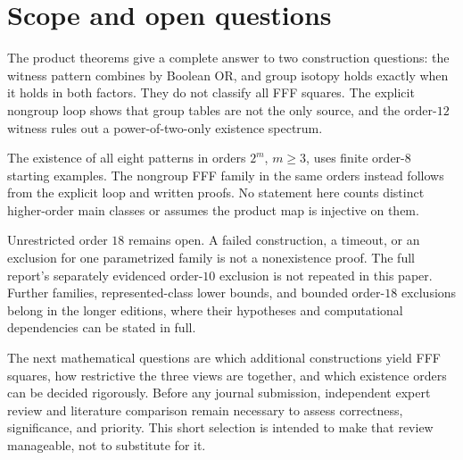 \section{Scope and open questions}

The product theorems give a complete answer to two construction questions:
the witness pattern combines by Boolean OR, and group isotopy holds exactly
when it holds in both factors. They do not classify all FFF squares. The
explicit nongroup loop shows that group tables are not the only source,
and the order-$12$ witness rules out a power-of-two-only existence spectrum.

The existence of all eight patterns in orders $2^m$, $m\geq3$, uses finite
order-$8$ starting examples. The nongroup FFF family in the same orders
instead follows from the explicit loop and written proofs. No statement
here counts distinct higher-order main classes or assumes the product map
is injective on them.

Unrestricted order $18$ remains open. A failed construction, a timeout, or
an exclusion for one parametrized family is not a nonexistence proof.
The full report's separately evidenced order-$10$ exclusion is not repeated
in this paper. Further families, represented-class lower bounds, and
bounded order-$18$ exclusions belong in the longer editions, where their
hypotheses and computational dependencies can be stated in full.

The next mathematical questions are which additional constructions yield
FFF squares, how restrictive the three views are together, and which
existence orders can be decided rigorously. Before any journal submission,
independent expert review and literature comparison remain necessary to
assess correctness, significance, and priority. This short selection is
intended to make that review manageable, not to substitute for it.
